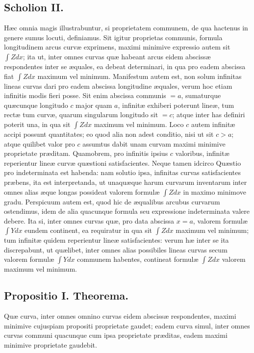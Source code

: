 \subsection*{Scholion II.}
Hæc omnia magis illustrabuntur, si proprietatem communem, de qua hactenus in genere sumus locuti, definiamus. Sit igitur proprietas communis, formula longitudinem arcus curvæ exprimens, maximi minimive expressio autem sit $\int Zdx$; ita ut, inter omnes curvas quæ habeant arcus eidem abscissæ respondentes inter se æquales, ea debeat determinari, in qua pro eadem abscissa fiat $\int Zdx$ maximum vel minimum. Manifestum autem est, non solum infinitas lineas curvas dari pro eadem abscissa longitudine æquales, verum hoc etiam infinitis modis fieri posse. Sit enim abscissa communis $=a$, sumaturque quæcunque longitudo $c$ major quam $a$, infinitæ exhiberi poterunt lineæ, tum rectæ tum curvæ, quarum singularum longitudo sit $=c$; atque inter has definiri poterit una, in qua sit $\int Zdx$ maximum vel minimum. Loco $c$ autem infinitæ accipi possunt quantitates; eo quod alia non adest conditio, nisi ut sit $c>a$; atque quilibet valor pro $c$ assumtus dabit unam curvam maximi minimive proprietate præditam. Quamobrem, pro infinitis ipsius $c$ valoribus, infinitæ reperientur lineæ curvæ quæstioni satisfacientes. Neque tamen idcirco Quæstio pro indeterminata est habenda: nam solutio ipsa, infinitas curvas satisfacientes præbens, ita est interpretanda, ut unaquæque harum curvarum inventarum inter omnes alias æque longas possideat valorem formulæ $\int Zdx$ in maximo minimove gradu. Perspicuum autem est, quod hic de æqualibus arcubus curvarum ostendimus, idem de alia quacunque formula seu expressione indeterminata valere debere. Ita si, inter omnes curvas quæ, pro data abscissa $x=a$, valorem formulæ $\int Ydx$ eundem continent, ea requiratur in qua sit $\int Zdx$ maximum vel minimum; tum infinitæ quidem reperientur lineæ satisfacientes: verum hæ inter se ita discrepabunt, ut quælibet, inter omnes alias possibiles lineas curvas secum valorem formulæ $\int Ydx$ communem habentes, contineat formulæ $\int Zdx$ valorem maximum vel minimum.

\subsection*{Propositio I. Theorema.}
Quæ curva, inter omnes omnino curvas eidem abscissæ respondentes, maximi minimive cujuspiam propositi proprietate gaudet; eadem curva simul, inter omnes curvas communi quacunque cum ipsa proprietate præditas, eadem maximi minimive proprietate gaudebit.

